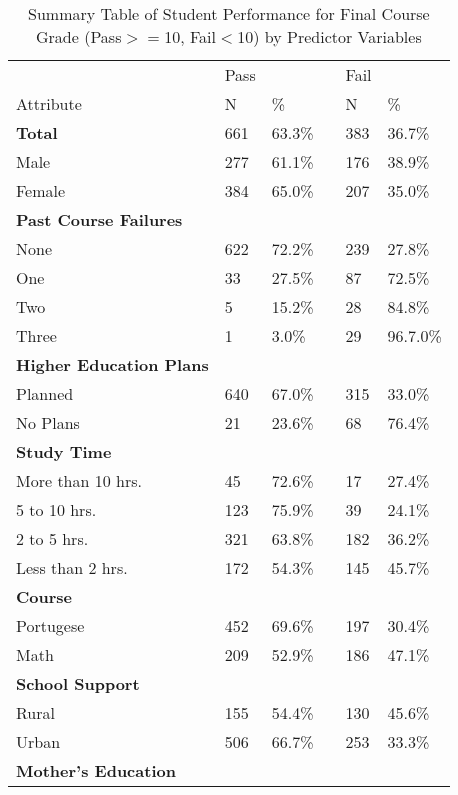 \documentclass[sigconf]{acmart}
\begin{document}
\begin{table}
  \caption{Summary Table of Student Performance for Final Course Grade 
  (Pass$>=$10, Fail$<$10) by Predictor Variables }
  \label{tab:freq}
  \begin{tabular}{llllll}
    \toprule
              & Pass & & & Fail & \\
    Attribute & N & \% &  & N & \% \\
    \midrule
    \textbf{Total} & 661 & 63.3\% & & 383 & 36.7\% \\
    \midrule
    Male      & 277 & 61.1\% & & 176 & 38.9\%  \\
    Female    & 384 & 65.0\% & & 207 & 35.0\%  \\
    \midrule
    \textbf{Past Course Failures} &  &  &  &  & \\
    None      & 622 & 72.2\% & &  239 & 27.8\% \\
    One       & 33  & 27.5\% & &   87 & 72.5\% \\
    Two       & 5   & 15.2\% & &   28 & 84.8\% \\
    Three     & 1   &  3.0\% & &   29 & 96.7.0\% \\
    \midrule
    \textbf{Higher Education Plans} &  &  &  &  & \\
    Planned   & 640 & 67.0\% & & 315 & 33.0\%  \\
    No Plans  &  21 & 23.6\% & &  68 & 76.4\%  \\
    \midrule
    \textbf{Study Time} &  &  &  &  &     \\
    More than 10 hrs. &  45 & 72.6\% & &  17 & 27.4\% \\
    5 to 10 hrs.      & 123 & 75.9\% & &  39 & 24.1\% \\
    2 to 5 hrs.       & 321 & 63.8\% & & 182 & 36.2\% \\    
    Less than 2 hrs.  & 172 & 54.3\% & & 145 & 45.7\% \\
    \midrule
    \textbf{Course} &  &  &  &  & \\
    Portugese  & 452 & 69.6\% & & 197 & 30.4\%  \\
    Math       & 209 & 52.9\% & & 186 & 47.1\%  \\  
    \midrule
    \textbf{School Support} &  &  &  &  & \\
    Rural    & 155 & 54.4\% & & 130 & 45.6\%  \\
    Urban    & 506 & 66.7\% & & 253 & 33.3\%  \\ 
    \midrule
    \textbf{Mother's Education} &  &  &  &  & \\

\end{tabular}
\end{table}
\end{document}
